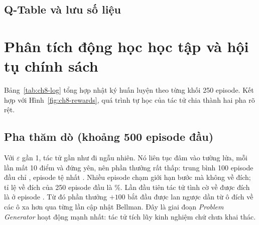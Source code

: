 

\subsection{Q-Table và lưu số liệu}

\section{Phân tích động học học tập và hội tụ chính sách}
Bảng~\ref{tab:ch8-log} tổng hợp nhật ký huấn luyện theo từng khối 250 episode. Kết hợp với Hình~\ref{fig:ch8-rewards},
quá trình tự học của tác tử chia thành hai pha rõ rệt.


\subsection{Pha thăm dò (khoảng 500 episode đầu)}
Với $\varepsilon$ gần 1, tác tử gần như đi ngẫu nhiên. Nó liên tục đâm vào tường lửa, mỗi lần mất 10 điểm và đứng yên,
nên phần thưởng rất thấp: trung bình 100 episode đầu chỉ , episode tệ nhất
. Nhiều episode chạm giới hạn  bước mà không về
đích; tỉ lệ về đích của 250 episode đầu là \%. Lần đầu tiên tác tử tình cờ về
được đích là ở episode . Từ đó phần thưởng $+100$ bắt đầu được lan ngược dần từ ô
đích về các ô xa hơn qua từng lần cập nhật Bellman. Đây là giai đoạn \emph{Problem Generator} hoạt động mạnh nhất: tác tử
tích lũy kinh nghiệm chứ chưa khai thác.

